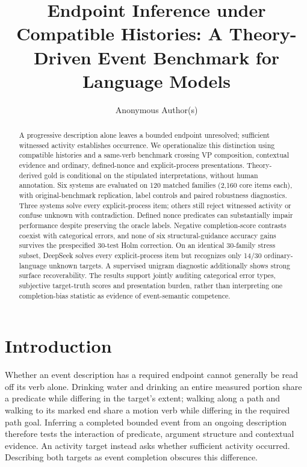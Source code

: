 \documentclass[sigconf,anonymous,review]{acmart}
\title[Endpoint Inference under Compatible Histories]{Endpoint Inference under Compatible Histories: A Theory-Driven Event Benchmark for Language Models}
\author{Anonymous Author(s)}
\begin{document}
\begin{abstract}
A progressive description alone leaves a bounded endpoint unresolved; sufficient witnessed activity establishes occurrence. We operationalize this distinction using compatible histories and a same-verb benchmark crossing VP composition, contextual evidence and ordinary, defined-nonce and explicit-process presentations. Theory-derived gold is conditional on the stipulated interpretations, without human annotation. Six systems are evaluated on 120 matched families (2,160 core items each), with original-benchmark replication, label controls and paired robustness diagnostics. Three systems solve every explicit-process item; others still reject witnessed activity or confuse unknown with contradiction. Defined nonce predicates can substantially impair performance despite preserving the oracle labels. Negative completion-score contrasts coexist with categorical errors, and none of six structural-guidance accuracy gains survives the prespecified 30-test Holm correction. On an identical 30-family stress subset, DeepSeek solves every explicit-process item but recognizes only 14/30 ordinary-language unknown targets. A supervised unigram diagnostic additionally shows strong surface recoverability. The results support jointly auditing categorical error types, subjective target-truth scores and presentation burden, rather than interpreting one completion-bias statistic as evidence of event-semantic competence.
\end{abstract}
\maketitle
\section{Introduction}
Whether an event description has a required endpoint cannot generally be read off its verb alone. Drinking water and drinking an entire measured portion share a predicate while differing in the target's extent; walking along a path and walking to its marked end share a motion verb while differing in the required path goal. Inferring a completed bounded event from an ongoing description therefore tests the interaction of predicate, argument structure and contextual evidence. An activity target instead asks whether sufficient activity occurred. Describing both targets as event completion obscures this difference.
\end{document}

